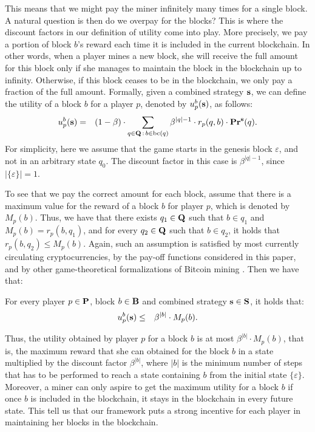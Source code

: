 This means that we might pay the miner infinitely many times for a single block. A natural question is then do we overpay for the blocks? This is where the discount factors in our definition of utility come into play.  More precisely, we pay a portion of block $b$'s reward each time it is included in the current blockchain. In other words, 
when a player mines a new block, she will receive the full amount for this block only if she manages to maintain the block in the blockchain up to infinity. Otherwise, if this block 
ceases to be in the blockchain, we only pay a fraction of the full amount. Formally, given a combined strategy $\mathbf{s}$, we can define the utility of a block $b$ for a player $p$, denoted by $u_p^b(\mathbf{s})$,  as follows:
\begin{eqnarray*}
u_p^b(\mathbf{s}) & =  & (1 - \beta) \cdot  \sum_{q \in \mathbf{Q} \,:\, b \in \text{bc}(q)} \beta^{|q|-1} \cdot  r_p(q,b) \cdot \mathbf{Pr}^{\mathbf{s}}(q).
\end{eqnarray*}
For simplicity, here we assume that the game starts in the genesis block $\varepsilon$, and not in an arbitrary state $q_0$. The discount factor in this case is $\beta^{|q|-1}$, since $|\{\varepsilon\}|= 1$.  


To see that we pay the correct amount for each block, assume that there is a maximum value for the reward of a block $b$ for player $p$, which is denoted by $M_p(b)$. Thus, we have that there exists $q_1 \in \mathbf{Q}$ such that $b \in q_1$ and $M_p(b) = r_p(b,q_1)$, and for every $q_2 \in \mathbf{Q}$ such that $b \in q_2$, it holds that $r_p(b,q_2) \leq M_p(b)$. Again, such an assumption is satisfied by most currently circulating cryptocurrencies, by the pay-off functions considered in this paper, and by other game-theoretical formalizations of Bitcoin mining \cite{mininggames:2016}. Then we have that:
\begin{myprop}\label{prop-ub-block}
For every player $p \in \mathbf{P}$, block $b \in \mathbf{B}$ and combined strategy $\mathbf{s} \in \mathbf{S}$, it holds that:
\begin{eqnarray*}
u^b_p(\mathbf{s}) & \leq &  \beta^{|b|} \cdot M_p(b).
\end{eqnarray*}
\end{myprop}
Thus, the utility obtained by player $p$ for a block $b$ is at most $\beta^{|b|} \cdot M_p(b)$, that is, the maximum reward that she can obtained for the block $b$ in a state multiplied by the discount factor $\beta^{|b|}$, where $|b|$ is the minimum number of steps that has to be performed to reach a state containing $b$ from the initial state $\{\varepsilon\}$. 
Moreover, a miner can only aspire to get the maximum utility for a block $b$ if once $b$ is included in the blockchain, it stays in the blockchain in every future state. This tell us that our framework puts a strong incentive for each player in maintaining her blocks in the blockchain.

